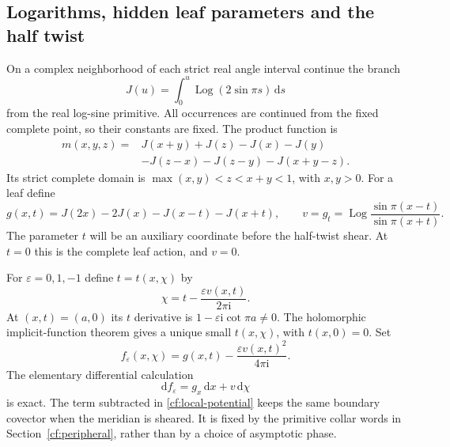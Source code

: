 \documentclass[11pt]{article}
\numberwithin{equation}{section}
\theoremstyle{definition}\newtheorem{definition}[theorem]{Definition}
\theoremstyle{remark}\newtheorem{remark}[theorem]{Remark}
\newcommand{\ii}{\mathrm i}
\newcommand{\dd}{\mathrm d}
\newcommand{\eps}{\varepsilon}
\newcommand{\Log}{\operatorname{Log}}
\begin{document}
\subsection{Logarithms, hidden leaf parameters and the half twist}
On a complex neighborhood of each strict real angle interval
continue the branch
\[
 J(u)=\int_0^u\Log(2\sin\pi s)\,\dd s
\]
from the real log-sine primitive. All occurrences are continued
from the fixed complete point, so their constants are fixed.
The product function is
\begin{equation}\label{cf:m}
\begin{split}
 m(x,y,z)={}&J(x+y)+J(z)-J(x)-J(y)\\
            &-J(z-x)-J(z-y)-J(x+y-z).
\end{split}
\end{equation}
Its strict complete domain is
$\max(x,y)<z<x+y<1$, with $x,y>0$.
For a leaf define
\begin{equation}\label{cf:g}
 g(x,t)=J(2x)-2J(x)-J(x-t)-J(x+t),\qquad
 v=g_t=\Log\frac{\sin\pi(x-t)}{\sin\pi(x+t)}.
\end{equation}
The parameter $t$ will be an auxiliary coordinate before the
half-twist shear. At $t=0$ this is the complete leaf action,
and $v=0$.

For $\eps=0,1,-1$ define $t=t(x,\chi)$ by
\begin{equation}\label{cf:shear}
 \chi=t-\frac{\eps v(x,t)}{2\pi\ii}.
\end{equation}
At $(x,t)=(a,0)$ its $t$ derivative is
$1-\eps\ii\cot\pi a\ne0$. The holomorphic implicit-function
theorem gives a unique small $t(x,\chi)$, with $t(x,0)=0$.
Set
\begin{equation}\label{cf:local-potential}
 f_\eps(x,\chi)
       =g(x,t)-\frac{\eps v(x,t)^2}{4\pi\ii}.
\end{equation}
The elementary differential calculation
\begin{equation}\label{cf:local-differential}
 \dd f_\eps=g_x\,\dd x+v\,\dd\chi
\end{equation}
is exact. The term subtracted in \eqref{cf:local-potential}
keeps the same boundary covector when the meridian is sheared.
It is fixed by the primitive collar words in
Section~\ref{cf:peripheral}, rather than by a choice of
asymptotic phase.
\end{document}
